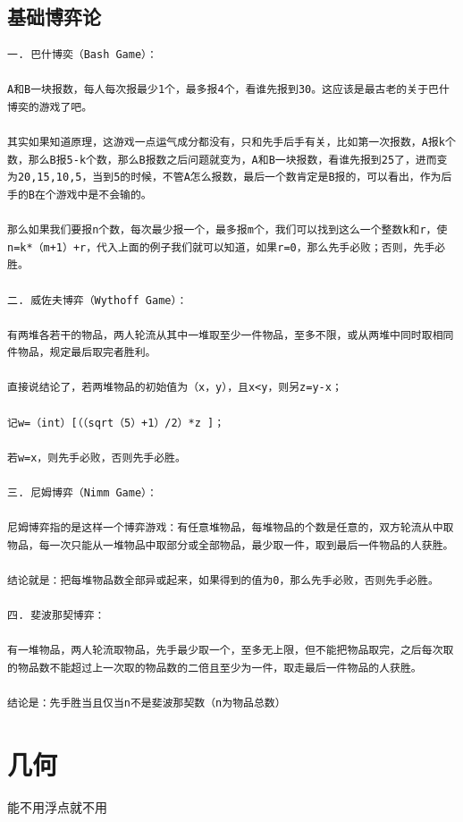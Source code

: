 \documentclass[12pt, a4paper, oneside]{ctexart}
\begin{document}
\subsection{基础博弈论} 
\begin{lstlisting}
一. 巴什博奕（Bash Game）：

A和B一块报数，每人每次报最少1个，最多报4个，看谁先报到30。这应该是最古老的关于巴什博奕的游戏了吧。

其实如果知道原理，这游戏一点运气成分都没有，只和先手后手有关，比如第一次报数，A报k个数，那么B报5-k个数，那么B报数之后问题就变为，A和B一块报数，看谁先报到25了，进而变为20,15,10,5，当到5的时候，不管A怎么报数，最后一个数肯定是B报的，可以看出，作为后手的B在个游戏中是不会输的。

那么如果我们要报n个数，每次最少报一个，最多报m个，我们可以找到这么一个整数k和r，使n=k*（m+1）+r，代入上面的例子我们就可以知道，如果r=0，那么先手必败；否则，先手必胜。

二. 威佐夫博弈（Wythoff Game）：

有两堆各若干的物品，两人轮流从其中一堆取至少一件物品，至多不限，或从两堆中同时取相同件物品，规定最后取完者胜利。

直接说结论了，若两堆物品的初始值为（x，y），且x<y，则另z=y-x；

记w=（int）[（（sqrt（5）+1）/2）*z ]；

若w=x，则先手必败，否则先手必胜。

三. 尼姆博弈（Nimm Game）：

尼姆博弈指的是这样一个博弈游戏：有任意堆物品，每堆物品的个数是任意的，双方轮流从中取物品，每一次只能从一堆物品中取部分或全部物品，最少取一件，取到最后一件物品的人获胜。

结论就是：把每堆物品数全部异或起来，如果得到的值为0，那么先手必败，否则先手必胜。

四. 斐波那契博弈：

有一堆物品，两人轮流取物品，先手最少取一个，至多无上限，但不能把物品取完，之后每次取的物品数不能超过上一次取的物品数的二倍且至少为一件，取走最后一件物品的人获胜。

结论是：先手胜当且仅当n不是斐波那契数（n为物品总数）
\end{lstlisting}

\newpage 
\section{几何}
能不用浮点就不用 
\end{document}
